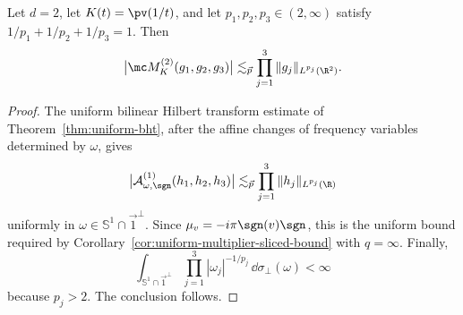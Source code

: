 \begin{corollary}
\label{cor:multiplier-affine-trick-plane}
Let $d=2$, let $K(t)=\pv(1/t)$, and let
$p_1,p_2,p_3\in(2,\infty)$ satisfy
\(1/p_1+1/p_2+1/p_3=1\).  Then
\[
  \bigl|\mc M_K^{(2)}(g_1,g_2,g_3)\bigr|
  \lesssim_{\vec p}
  \prod_{j=1}^3\|g_j\|_{L^{p_j}(\R^2)}.
\]
\end{corollary}

\begin{proof}
The uniform bilinear Hilbert transform estimate
of Theorem~\ref{thm:uniform-bht}, after the affine changes of frequency
variables determined by $\omega$, gives
\[
  \bigl|\mathcal A_{\omega,\sgn}^{(1)}(h_1,h_2,h_3)\bigr|
  \lesssim_{\vec p}
  \prod_{j=1}^3\|h_j\|_{L^{p_j}(\R)}
\]
uniformly in $\omega\in\mathbb S^1\cap\vec1^\perp$.  Since
$\mu_v=-i\pi\sgn(v)\sgn$, this is the uniform bound required by
Corollary~\ref{cor:uniform-multiplier-sliced-bound} with $q=\infty$.
Finally,
\[
  \int_{\mathbb S^1\cap\vec1^\perp}
  \prod_{j=1}^3|\omega_j|^{-1/p_j}\,
  \dd\sigma_\perp(\omega)<\infty
\]
because $p_j>2$.  The conclusion follows.
\end{proof}
